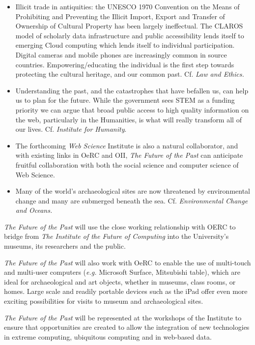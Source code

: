 \documentclass[11pt,twoside]{article}\makeatletter
\begin{document}
\begin{itemize}
\item Illicit trade in antiquities: the UNESCO 1970 Convention on the Means of Prohibiting and Preventing the Illicit Import, Export and Transfer of Ownership of Cultural Property has been largely ineffectual. The CLAROS model of scholarly data infrastructure and public accessibility lends itself to emerging Cloud computing which lends itself to individual participation. Digital cameras and mobile phones are increasingly common in source countries. Empowering/educating the individual is the first step towards protecting the cultural heritage, and our common past. Cf. \textit{Law and Ethics.}
\item Understanding the past, and the catastrophes that have befallen us, can help us to plan for the future. While the government sees STEM as a funding priority we can argue that broad public access to high quality information on the web, particularly in the Humanities, is what will really transform all of our lives. Cf. \textit{Institute for Humanity}. 
\item The forthcoming \textit{Web Science} Institute is also a natural collaborator, and with existing links in OeRC and OII, \textit{The Future of the Past} can anticipate fruitful collaboration with both the social science and computer science of Web Science.  
\item Many of the world’s archaeological sites are now threatened by environmental change and many are submerged beneath the sea. Cf. \textit{Environmental Change and Oceans.}
\end{itemize} \par \textit{The Future of the Past} will use the close working relationship with OERC to bridge from \textit{The Institute of the Future of Computing} into the University’s museums, its researchers and the public. \par \textit{The Future of the Past} will also work with OeRC to enable the use of multi-touch and multi-user computers (\textit{e.g.} Microsoft Surface, Mitsubishi table), which are ideal for archaeological and art objects, whether in museums, class rooms, or homes. Large scale and readily portable devices such as the iPad offer even more exciting possibilities for visits to museum and archaeological sites. \par \textit{The Future of the Past} will be represented at the workshops of the Institute to ensure that opportunities are created to allow the integration of new technologies in extreme computing, ubiquitous computing and in web-based data. 
\end{document}
